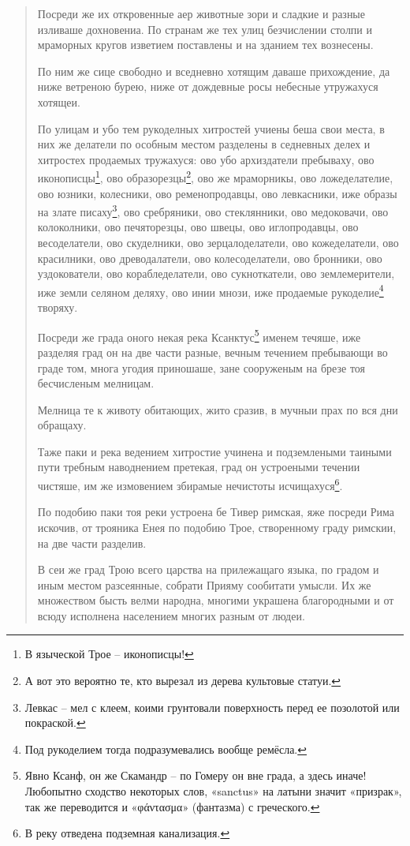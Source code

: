 \begin{quotation}
Посреди же их откровенные аер животные зори и  сладкие и разные изливаше дохновениа. По странам же тех улиц безчислении столпи и мраморных кругов изветием поставлены и на зданием тех вознесены.

По ним же сице свободно и вседневно хотящим даваше прихождение, да ниже ветреною бурею, ниже от дождевные росы небесные утружахуся хотящеи.

По улицам и убо тем рукоделных хитростей учиены беша свои места, в них же делатели по особным местом разделены в седневных делех и хитростех продаемых тружахуся: ово убо архиздатели пребываху, ово иконописцы\footnote{В языческой Трое – иконописцы!}, ово образорезцы\footnote{А вот это вероятно те, кто вырезал из дерева культовые статуи.}, ово же мраморникы, ово ложеделателие, ово юзники, колесники, ово ременопродавцы, ово левкасники, иже образы на злате писаху\footnote{Левкас – мел с клеем, коими грунтовали поверхность перед ее позолотой или покраской.}, ово сребряники, ово стеклянники, ово медоковачи, ово колоколники, ово печяторезцы, ово швецы, ово иглопродавцы, ово весоделатели, ово скуделники, ово зерцалоделатели, ово кожеделатели, ово красилники, ово древодалатели, ово колесоделатели, ово бронники, ово уздокователи, ово корабледелатели, ово сукноткатели, ово землемерители, иже земли селяном деляху, ово инии мнози, иже продаемые рукоделие\footnote{Под рукоделием тогда подразумевались вообще ремёсла.} творяху.

Посреди же града оного некая река Ксанктус\footnote{Явно Ксанф, он же Скамандр – по Гомеру он вне града, а здесь иначе! Любопытно сходство некоторых слов, «sanctus» на латыни значит «призрак», так же переводится и «φάντασμα» (фантазма) с греческого.} именем течяше, иже разделяя град он на две части разные, вечным течением пребывающи во граде том, многа угодия приношаше, зане сооруженым на брезе тоя бесчисленым мелницам.

Мелница те к животу обитающих, жито сразив, в мучныи прах по вся дни обращаху. 

Таже паки и река ведением хитростие учинена и подземлеными таиными пути требным наводнением претекая, град он устроеными течении чистяше, им же измовением збирамые нечистоты исчищахуся\footnote{В реку отведена подземная канализация.}.

По подобию паки тоя реки устроена бе Тивер римская, яже посреди Рима искочив, от трояника Енея по подобию Трое, створенному граду римскии, на две части разделив.

В сеи же град Трою всего царства на прилежащаго языка, по градом и иным местом разсеянные, собрати Прияму сообитати умысли. Их же множеством бысть велми народна, многими украшена благородными и от всюду исполнена населением многих разным от людеи.


\end{quotation}

